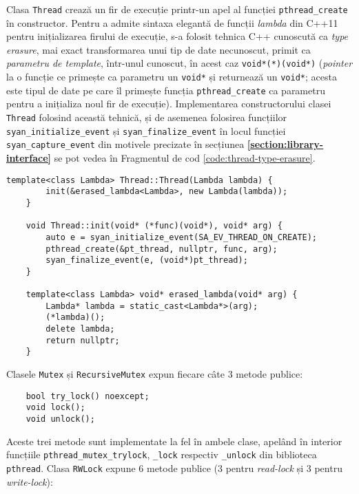 Clasa \lstinline{Thread} crează un fir de execuție printr-un apel al
funcției \lstinline{pthread_create} în constructor. Pentru a admite
sintaxa elegantă de funcții \textit{lambda} din C++11 pentru
inițializarea firului de execuție, s-a folosit tehnica C++ cunoscută ca
\textit{type erasure}\cite{TypeErasure}, mai exact transformarea unui
tip de date necunoscut, primit ca \textit{parametru de template},
într-unul cunoscut, în acest caz \lstinline{void*(*)(void*)}
(\textit{pointer} la o funcție ce primește ca parametru un
\lstinline{void*} și returnează un \lstinline{void*}; acesta este tipul
de date pe care îl primește funcția \lstinline{pthread_create} ca
parametru pentru a inițializa noul fir de execuție). Implementarea
constructorului clasei \lstinline{Thread} folosind această tehnică,
și de asemenea folosirea funcțiilor \lstinline{syan_initialize_event} și
\lstinline{syan_finalize_event} în locul funcției
\lstinline{syan_capture_event} din motivele precizate în secțiunea
\textbf{\ref{section:library-interface}} se pot vedea în Fragmentul de
cod \ref{code:thread-type-erasure}.
\begin{lstlisting}[caption=Tehnica \textit{type-erasure} în
                           clasa \lstinline{Thread} din
                           \lstinline{cxxsync},
                   label=code:thread-type-erasure]
    template<class Lambda> Thread::Thread(Lambda lambda) {
        init(&erased_lambda<Lambda>, new Lambda(lambda));
    }

    void Thread::init(void* (*func)(void*), void* arg) {
        auto e = syan_initialize_event(SA_EV_THREAD_ON_CREATE);
        pthread_create(&pt_thread, nullptr, func, arg);
        syan_finalize_event(e, (void*)pt_thread);
    }

    template<class Lambda> void* erased_lambda(void* arg) {
        Lambda* lambda = static_cast<Lambda*>(arg);
        (*lambda)();
        delete lambda;
        return nullptr;
    }
\end{lstlisting}

Clasele \lstinline{Mutex} și \lstinline{RecursiveMutex} expun fiecare
câte 3 metode publice:
\begin{lstlisting}
    bool try_lock() noexcept;
    void lock();
    void unlock();
\end{lstlisting}

Aceste trei metode sunt implementate la fel în ambele clase, apelând în
interior funcțiile \lstinline{pthread_mutex_trylock},
\lstinline{_lock} respectiv \lstinline{_unlock} din biblioteca
\lstinline{pthread}. Clasa \lstinline{RWLock} expune 6 metode publice
(3 pentru \textit{read-lock} și 3 pentru \textit{write-lock}):

